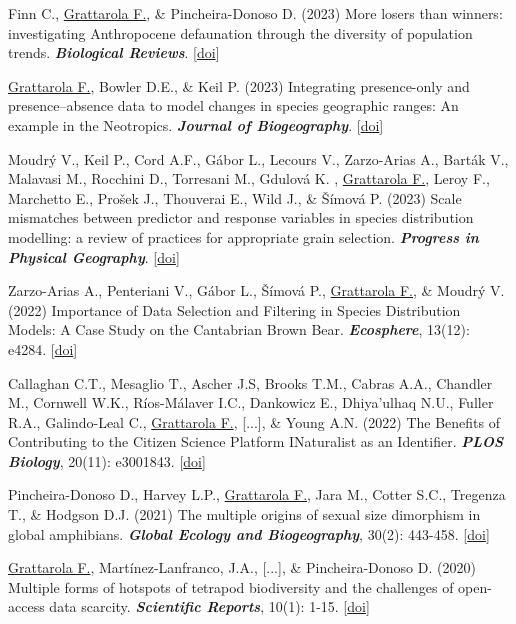 \documentclass[9pt]{developercv} %
\begin{document}
\begin{etaremune}
\item Finn C., \underline{Grattarola F.}, \& Pincheira-Donoso D. (2023) More losers than winners: investigating Anthropocene defaunation through the diversity of population trends. \textit{\textbf{Biological Reviews}}. [\href{https://doi.org/10.1111/brv.12974}{doi}]

\item \underline{Grattarola F.}, Bowler D.E., \& Keil P. (2023) Integrating presence-only and presence–absence data to model changes in species geographic ranges: An example in the Neotropics. \textit{\textbf{Journal of Biogeography}}. [\href{https://doi.org/10.1111/jbi.14622}{doi}]

\item Moudrý V., Keil P., Cord A.F., Gábor L., Lecours V., Zarzo-Arias A., Barták V.,  Malavasi M., Rocchini D., Torresani M., Gdulová K. , \underline{Grattarola F.}, Leroy F., Marchetto E., Prošek J., Thouverai E., Wild J., \& Šímová P. (2023) Scale mismatches between predictor and response variables in species distribution modelling: a review of practices for appropriate grain selection. \textit{\textbf{Progress in Physical Geography}}. [\href{https://doi.org/10.1177/03091333231156362}{doi}]

\item Zarzo-Arias A., Penteriani V.,  Gábor L., Šímová P.,  \underline{Grattarola F.}, \& Moudrý V. (2022) Importance of Data Selection and Filtering in Species Distribution Models: A Case Study on the Cantabrian Brown Bear. \textit{\textbf{Ecosphere}}, 13(12): e4284. [\href{https://doi.org/10.1002/ecs2.4284}{doi}]

\item Callaghan C.T., Mesaglio T., Ascher J.S, Brooks T.M., Cabras A.A., Chandler M., Cornwell W.K., Ríos-Málaver I.C., Dankowicz E., Dhiya’ulhaq N.U., Fuller R.A., Galindo-Leal C., \underline{Grattarola F.}, [...], \& Young A.N. (2022) The Benefits of Contributing to the Citizen Science Platform INaturalist as an Identifier. \textit{\textbf{PLOS Biology}}, 20(11): e3001843. [\href{https://doi.org/10.1371/journal.pbio.3001843}{doi}]

\item Pincheira-Donoso D., Harvey L.P., \underline{Grattarola F.}, Jara M., Cotter S.C., Tregenza T., \& Hodgson D.J. (2021) The multiple origins of sexual size dimorphism in global amphibians. \textit{\textbf{Global Ecology and Biogeography}}, 30(2): 443-458. [\href{https://doi.org/10.1111/geb.13230}{doi}]

\item \underline{Grattarola F.}, Martínez-Lanfranco, J.A., [...], \& Pincheira-Donoso D. (2020) Multiple forms of hotspots of tetrapod biodiversity and the challenges of open-access data scarcity. \textit{\textbf{Scientific Reports}}, 10(1): 1-15. [\href{https://doi.org/10.1038/s41598-020-79074-8}{doi}]


\end{etaremune}
\end{document}
